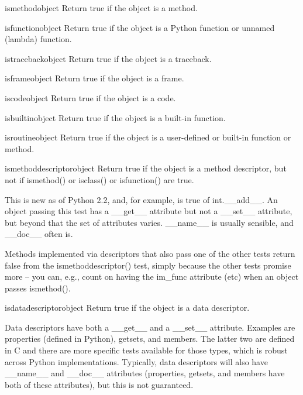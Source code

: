 \begin{funcdesc}{ismethod}{object}
  Return true if the object is a method.
\end{funcdesc}

\begin{funcdesc}{isfunction}{object}
  Return true if the object is a Python function or unnamed (lambda) function.
\end{funcdesc}

\begin{funcdesc}{istraceback}{object}
  Return true if the object is a traceback.
\end{funcdesc}

\begin{funcdesc}{isframe}{object}
  Return true if the object is a frame.
\end{funcdesc}

\begin{funcdesc}{iscode}{object}
  Return true if the object is a code.
\end{funcdesc}

\begin{funcdesc}{isbuiltin}{object}
  Return true if the object is a built-in function.
\end{funcdesc}

\begin{funcdesc}{isroutine}{object}
  Return true if the object is a user-defined or built-in function or method.
\end{funcdesc}

\begin{funcdesc}{ismethoddescriptor}{object}
  Return true if the object is a method descriptor, but not if ismethod() or 
  isclass() or isfunction() are true.

  This is new as of Python 2.2, and, for example, is true of int.__add__.
  An object passing this test has a __get__ attribute but not a __set__
  attribute, but beyond that the set of attributes varies.  __name__ is
  usually sensible, and __doc__ often is.

  Methods implemented via descriptors that also pass one of the other
  tests return false from the ismethoddescriptor() test, simply because
  the other tests promise more -- you can, e.g., count on having the
  im_func attribute (etc) when an object passes ismethod().
\end{funcdesc}

\begin{funcdesc}{isdatadescriptor}{object}
  Return true if the object is a data descriptor.

  Data descriptors have both a __get__ and a __set__ attribute.  Examples are
  properties (defined in Python), getsets, and members.  The latter two are
  defined in C and there are more specific tests available for those types,
  which is robust across Python implementations.  Typically, data descriptors
  will also have __name__ and __doc__ attributes (properties, getsets, and
  members have both of these attributes), but this is not guaranteed.
\end{funcdesc}

